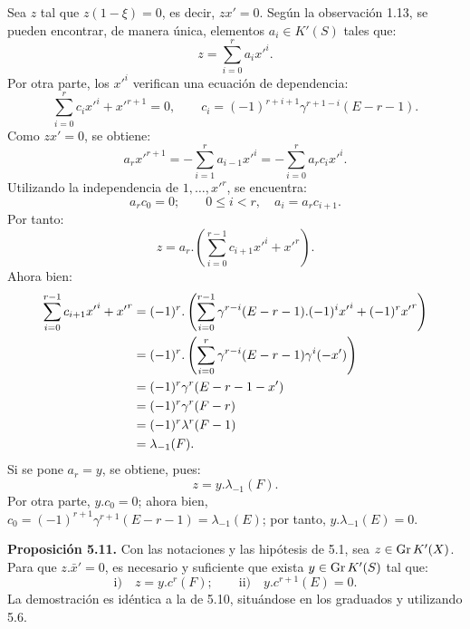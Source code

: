 Sea $z$ tal que $z(1-\xi)=0$, es decir, $zx'=0$. Según la observación 1.13, se pueden encontrar, de manera única, elementos $a_i\in K'(S)$ tales que:
\[
  z=\sum_{i=0}^{r}a_i{x'}^i .
\]
Por otra parte, los ${x'}^i$ verifican una ecuación de dependencia:
\[
  \sum_{i=0}^{r}c_i{x'}^i+{x'}^{r+1}=0,
  \qquad c_i=(-1)^{r+i+1}\gamma^{r+1-i}(E-r-1).
\]
Como $zx'=0$, se obtiene:
\[
  a_r{x'}^{r+1}=-\sum_{i=1}^{r}a_{i-1}{x'}^i
  =-\sum_{i=0}^{r}a_rc_i{x'}^i .
\]
Utilizando la independencia de $1,\ldots,{x'}^r$, se encuentra:
\[
  a_rc_0=0;
  \qquad 0\le i<r,
  \quad a_i=a_rc_{i+1}.
\]
Por tanto:
\[
  z=a_r.\left(\sum_{i=0}^{r-1}c_{i+1}{x'}^i+{x'}^r\right).
\]
Ahora bien:
\[
\begin{aligned}
\sum_{i=0}^{r-1}c_{i+1}{x'}^i+{x'}^r
&=(-1)^r.\left(\sum_{i=0}^{r-1}\gamma^{r-i}(E-r-1).(-1)^i{x'}^i+(-1)^r{x'}^r\right)\\
&=(-1)^r.\left(\sum_{i=0}^{r}\gamma^{r-i}(E-r-1)\gamma^i(-x')\right)\\
&=(-1)^r\gamma^r(E-r-1-x')\\
&=(-1)^r\gamma^r(\sisi{F-x'}{F-r})\\
&=(-1)^r\lambda^r(F-1)\\
&=\lambda_{-1}(F).
\end{aligned}
\]
Si se pone $a_r=y$, se obtiene, pues:
\[
  z=y.\lambda_{-1}(F).
\]
Por otra parte, $y.c_0=0$; ahora bien, $c_0=(-1)^{r+1}\gamma^{r+1}(E-r-1)=\lambda_{-1}(E)$; por tanto, $y.\lambda_{-1}(E)=0$.

\textbf{Proposición 5.11.} Con las notaciones y las hipótesis de 5.1, sea $z\in \Gr K'(X)$. Para que $z.\bar x'=0$, es necesario y suficiente que exista $y\in \Gr K'(S)$ tal que:
\[
  \text{i)}\quad z=y.c^r(F);
  \qquad
  \text{ii)}\quad y.c^{r+1}(E)=0.
\]
La demostración es idéntica a la de 5.10, situándose en los graduados y utilizando 5.6.

